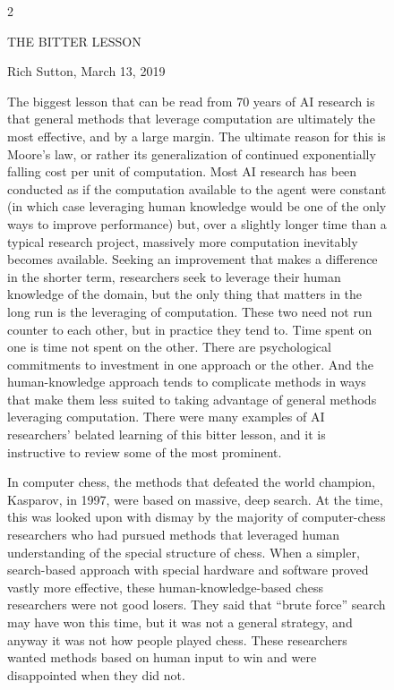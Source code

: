 \documentclass[10pt,conference]{IEEEtran}
\begin{document}
\begin{figure}[!t]
\centering
\begin{minipage}{0.94\textwidth}
\fontsize{6.6}{7.0}\selectfont\ttfamily
\setlength{\parskip}{2.5pt}\setlength{\parindent}{0pt}
\begin{multicols}{2}
\centerline{THE BITTER LESSON}
\centerline{Rich Sutton, March 13, 2019}
\medskip

The biggest lesson that can be read from 70 years of AI research is
that general methods that leverage computation are ultimately the most
effective, and by a large margin. The ultimate reason for this is
Moore's law, or rather its generalization of continued exponentially
falling cost per unit of computation. Most AI research has been
conducted as if the computation available to the agent were constant
(in which case leveraging human knowledge would be one of the only
ways to improve performance) but, over a slightly longer time than a
typical research project, massively more computation inevitably
becomes available. Seeking an improvement that makes a difference in
the shorter term, researchers seek to leverage their human knowledge
of the domain, but the only thing that matters in the long run is the
leveraging of computation. These two need not run counter to each
other, but in practice they tend to. Time spent on one is time not
spent on the other. There are psychological commitments to investment
in one approach or the other. And the human-knowledge approach tends
to complicate methods in ways that make them less suited to taking
advantage of general methods leveraging computation. There were many
examples of AI researchers' belated learning of this bitter lesson,
and it is instructive to review some of the most prominent.

{\color{blue!55!black}
In computer chess, the methods that defeated the world champion,
Kasparov, in 1997, were based on massive, deep search. At the time,
this was looked upon with dismay by the majority of computer-chess
researchers who had pursued methods that leveraged human understanding
of the special structure of chess. When a simpler, search-based
approach with special hardware and software proved vastly more
effective, these human-knowledge-based chess researchers were not good
losers. They said that ``brute force'' search may have won this time,
but it was not a general strategy, and anyway it was not how people
played chess. These researchers wanted methods based on human input to
win and were disappointed when they did not.

}
\end{multicols}
\end{minipage}
\end{figure}
\end{document}

